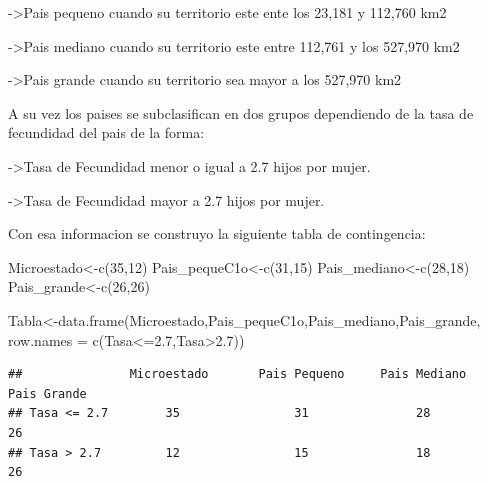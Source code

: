\documentclass[
]{article}
\newenvironment{Shaded}{\begin{snugshade}}{\end{snugshade}}
\newcommand{\AttributeTok}[1]{\textcolor[rgb]{0.77,0.63,0.00}{#1}}
\newcommand{\DecValTok}[1]{\textcolor[rgb]{0.00,0.00,0.81}{#1}}
\newcommand{\FunctionTok}[1]{\textcolor[rgb]{0.00,0.00,0.00}{#1}}
\newcommand{\NormalTok}[1]{#1}
\newcommand{\OtherTok}[1]{\textcolor[rgb]{0.56,0.35,0.01}{#1}}
\newcommand{\StringTok}[1]{\textcolor[rgb]{0.31,0.60,0.02}{#1}}
\begin{document}
-\textgreater Pais pequeno cuando su territorio este ente los 23,181 y
112,760 km2

-\textgreater Pais mediano cuando su territorio este entre 112,761 y los
527,970 km2

-\textgreater Pais grande cuando su territorio sea mayor a los 527,970
km2

A su vez los paises se subclasifican en dos grupos dependiendo de la
tasa de fecundidad del pais de la forma:

-\textgreater Tasa de Fecundidad menor o igual a 2.7 hijos por mujer.

-\textgreater Tasa de Fecundidad mayor a 2.7 hijos por mujer.

Con esa informacion se construyo la siguiente tabla de contingencia:

\begin{Shaded}
\begin{Highlighting}[]
\NormalTok{Microestado}\OtherTok{\textless{}{-}}\FunctionTok{c}\NormalTok{(}\DecValTok{35}\NormalTok{,}\DecValTok{12}\NormalTok{)}
\NormalTok{Pais\_pequeC1o}\OtherTok{\textless{}{-}}\FunctionTok{c}\NormalTok{(}\DecValTok{31}\NormalTok{,}\DecValTok{15}\NormalTok{)}
\NormalTok{Pais\_mediano}\OtherTok{\textless{}{-}}\FunctionTok{c}\NormalTok{(}\DecValTok{28}\NormalTok{,}\DecValTok{18}\NormalTok{)}
\NormalTok{Pais\_grande}\OtherTok{\textless{}{-}}\FunctionTok{c}\NormalTok{(}\DecValTok{26}\NormalTok{,}\DecValTok{26}\NormalTok{)}
\end{Highlighting}
\end{Shaded}

\begin{Shaded}
\begin{Highlighting}[]
\NormalTok{Tabla}\OtherTok{\textless{}{-}}\FunctionTok{data.frame}\NormalTok{(Microestado,Pais\_pequeC1o,Pais\_mediano,Pais\_grande,}
                  \AttributeTok{row.names =} \FunctionTok{c}\NormalTok{(}\StringTok{\textquotesingle{}Tasa\textless{}=2.7\textquotesingle{}}\NormalTok{,}\StringTok{\textquotesingle{}Tasa\textgreater{}2.7\textquotesingle{}}\NormalTok{))}
\end{Highlighting}
\end{Shaded}

\begin{verbatim}
##               Microestado       Pais Pequeno     Pais Mediano     Pais Grande    
## Tasa <= 2.7        35                31               28              26
## Tasa > 2.7         12                15               18              26
\end{verbatim}
\end{document}
